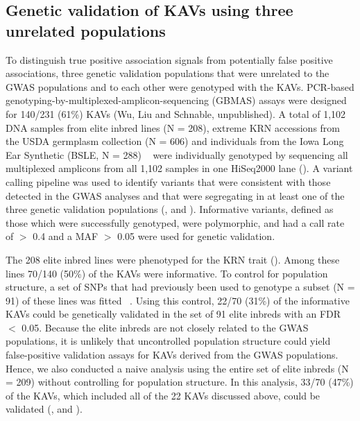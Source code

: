 \documentclass[10pt,letterpaper]{article}
\begin{document}
\subsection*{Genetic validation of KAVs using three unrelated populations}
To distinguish true positive association signals from potentially false positive associations, three genetic validation populations that were unrelated to the GWAS populations and to each other were genotyped with the KAVs. PCR-based genotyping-by-multiplexed-amplicon-sequencing (GBMAS) assays were designed for 140/231 (61\%) KAVs (Wu, Liu and Schnable, unpublished). A total of 1,102 DNA samples from elite inbred lines (N = 208), extreme KRN accessions from the USDA germplasm collection (N = 606) and individuals from the Iowa Long Ear Synthetic (BSLE, N = 288) ~\cite{Hallauer2005} were individually genotyped by sequencing all multiplexed amplicons from all 1,102 samples in one HiSeq2000 lane (). A variant calling pipeline was used to identify variants that were consistent with those detected in the GWAS analyses and that were segregating in at least one of the three genetic validation populations (,  and ). Informative variants, defined as those which were successfully genotyped, were polymorphic, and had a call rate of  $>$ 0.4 and a MAF $>$ 0.05 were used for genetic validation.

The 208 elite inbred lines were phenotyped for the KRN trait (). Among these lines 70/140 (50\%) of the KAVs were informative. To control for population structure, a set of SNPs that had previously been used to genotype a subset (N = 91) of these lines was fitted ~\cite{Nelson2008}. Using this control, 22/70 (31\%) of the informative KAVs could be genetically validated in the set of 91 elite inbreds with an FDR $<$ 0.05. Because the elite inbreds are not closely related to the GWAS populations, it is unlikely that uncontrolled population structure could yield false-positive validation assays for KAVs derived from the GWAS populations. Hence, we also conducted a naive analysis using the entire set of elite inbreds (N = 209) without controlling for population structure. In this analysis, 33/70 (47\%) of the KAVs, which included all of the 22 KAVs discussed above, could be validated (,  and ). 
\end{document}
